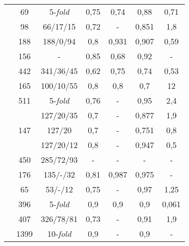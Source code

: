 \begin{table}[ht]
\begin{tabular}{ccccccc}
\cite{Pennig:2021}                      & 69                   & 5-\textit{fold}                   & 0,75 & 0,74  & 0,88  & 0,71  \\
\cite{Jünger:2021}                      & 98                   & 66/17/15                    & 0,72 & -     & 0,851 & 1,8   \\
\cite{Park:2021}                        & 188                  & 188/0/94                    & 0,8  & 0,931 & 0,907 & 0,59  \\
\cite{Yi:2021}                          & 156                  & -                           & 0,85 & 0,68  & 0,92  & -     \\
\cite{Yoo:2021}                         & 442                  & 341/36/45                   & 0,62 & 0,75  & 0,74  & 0,53  \\
\cite{Grøvik:2021}                      & 165                  & 100/10/55                   & 0,8  & 0,8   & 0,7   & 12    \\
\cite{Hsu:2021}                         & 511                  & 5-\textit{fold}                    & 0,76 & -     & 0,95  & 2,4   \\
\multirow{3}{*}{\cite{Cho:2021}}        & \multirow{3}{*}{147} & 127/20/35                   & 0,7  & -     & 0,877 & 1,9   \\
                              &                      & 127/20                      & 0,7  & -     & 0,751 & 0,8   \\
                              &                      & 127/20/12                   & 0,8  & -     & 0,947 & 0,5   \\
\cite{Sun:2021}                         & 450                  & 285/72/93                   & -    & -     & -     & -     \\
\cite{Huang:2022}                       & 176                  & 135/-/32                    & 0,81 & 0,987 & 0,975 & -     \\
\cite{Yoo:2022}                         & 65                   & 53/-/12                     & 0,75 & -     & 0,97  & 1,25  \\
\cite{Bouget:2022}                      & 396                  & 5-\textit{fold}                   & 0,9  & 0,9   & 0,9   & 0,061 \\
\cite{Liang:2022}                       & 407                  & 326/78/81                   & 0,73 & -     & 0,91  & 1,9   \\
\cite{Lyu:2022}                         & 1399                 & 10-\textit{fold}                  & 0,9  & -     & 0,9   & -     \\

\end{tabular}
\end{table}
